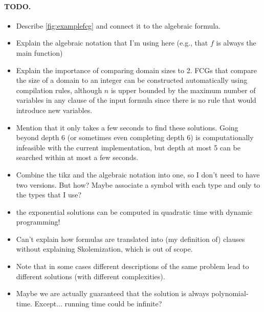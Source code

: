 \paragraph{TODO.}
\begin{itemize}
\item Describe \cref{fig:examplefcg} and connect it to the algebraic formula.
\item Explain the algebraic notation that I'm using here (e.g., that $f$ is always the main function)
\item Explain the importance of comparing domain sizes to 2. FCGs that compare the size of a domain to an integer can be constructed automatically using compilation rules, although $n$ is upper bounded by the maximum number of variables in any clause of the input formula since there is no rule that would introduce new variables.
\item Mention that it only takes a few seconds to find these solutions. Going beyond depth 6 (or sometimes even completing depth 6) is computationally infeasible with the current implementation, but depth at most 5 can be searched within at most a few seconds.
\item Combine the tikz and the algebraic notation into one, so I don't need to have two versions. But how? Maybe associate a symbol with each type and only to the types that I use?
\item the exponential solutions can be computed in quadratic time with dynamic programming!
\item Can't explain how formulas are translated into (my definition of) clauses without explaining Skolemization, which is out of scope.
\item Note that in some cases different descriptions of the same problem lead to different solutions (with different complexities).
\item Maybe we are actually guaranteed that the solution is always polynomial-time. Except... running time could be infinite?
\end{itemize}

